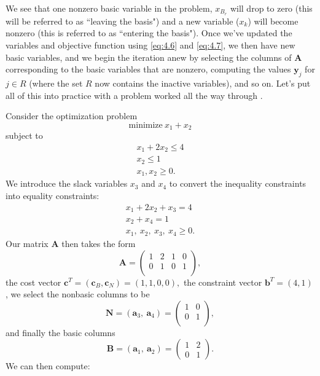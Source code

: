 \documentclass[12pt,english]{article}
\begin{document}
We see that one nonzero basic variable in the problem, $x_{B_r}$ will drop to zero (this will be referred to as ``leaving the basis") and a new variable ($x_k$) will become nonzero (this is referred to as ``entering the basis").  Once we've updated the variables and objective function using \eqref{eq:4.6} and \eqref{eq:4.7}, we then have new basic variables, and we begin the iteration anew by selecting the columns of $\mathbf{A}$ corresponding to the basic variables that are nonzero, computing the values $\mathbf{y}_j$ for $j\in R$ (where the set $R$ now contains the inactive variables), and so on.   Let's put all of this into practice with a problem worked all the way through \cite{BaJaSh:90}.

Consider the optimization problem 
$$
\text{minimize}~ x_1 + x_2
$$
subject to 
$$
\begin{array}{c}
x_1 + 2x_2 \leq 4 \\
x_2 \leq 1 \\
x_1, x_2 \geq 0.
\end{array}
$$
We introduce the slack variables $x_3$ and $x_4$ to convert the inequality constraints into equality constraints:
$$
\begin{array}{c}
x_1 + 2 x_2 + x_3 = 4 \\
x_2 + x_4 		     =1 \\
x_1, ~x_2, ~x_3, ~x_4 \geq 0.
\end{array}
$$
Our matrix $\mathbf{A}$ then takes the form
$$
\mathbf{A} = 
\left(
\begin{array}{cccc}
1	&	2	& 	1	&	0 	\\
0	&	1	&	0	&	1	\\
\end{array}
\right),
$$
the cost vector $\mathbf{c}^T = \left( \mathbf{c}_B, \mathbf{c}_N\right) = (1,1,0,0),$ the constraint vector $\mathbf{b}^T = \left( 4, 1 \right)$, we select the nonbasic columns to be
$$
\mathbf{N} = \left( \mathbf{a}_3,~ \mathbf{a}_4\right) =
\left(
\begin{array}{cc}
1	&	0 	\\
0	&	1	\\
\end{array}
\right),
$$
and finally the basic columns 
$$
\mathbf{B} = \left( \mathbf{a}_1,~ \mathbf{a}_2\right) = 
\left(
\begin{array}{cc}
1	&	2	\\
0	&	1
\end{array}
\right).
$$
We can then compute:
\end{document}
